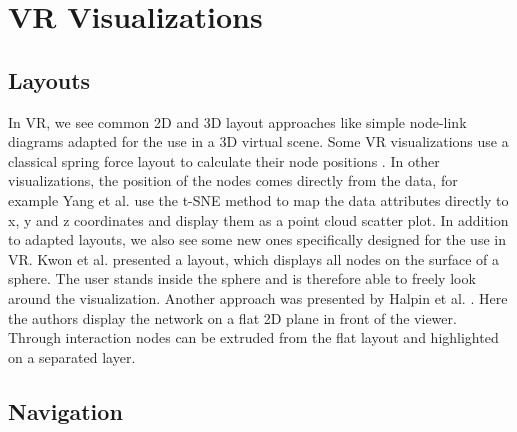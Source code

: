 \section{VR Visualizations}
\label{chap:rw-VRVIS}
\subsection{Layouts}
\label{chap:rw-vrlayouts}
In VR, we see common 2D and 3D layout approaches like simple node-link diagrams adapted for the use in a 3D virtual scene. 
Some VR visualizations use a classical spring force layout to calculate their node positions \cite{drogemuller_examining_2020} \cite{sorger_immersive_2019}.
In other visualizations, the position of the nodes comes directly from the data, for example Yang et al. \cite{yang_embodied_2020} use the t-SNE method \cite{maaten_visualizing_2008} to map the data attributes directly to x, y and z coordinates and display them as a point cloud scatter plot.
In addition to adapted layouts, we also see some new ones specifically designed for the use in VR. Kwon et al. \cite{kwon_study_2016} presented a layout, which displays all nodes on the surface of a sphere. The user stands inside the sphere and is therefore able to freely look around the visualization. Another approach was presented by Halpin et al. \cite{halpin_exploring_2008}. Here the authors display the network on a flat 2D plane in front of the viewer. Through interaction nodes can be extruded from the flat layout and highlighted on a separated layer.     

\subsection{Navigation}
\label{chap:rw-vrnavigation}

